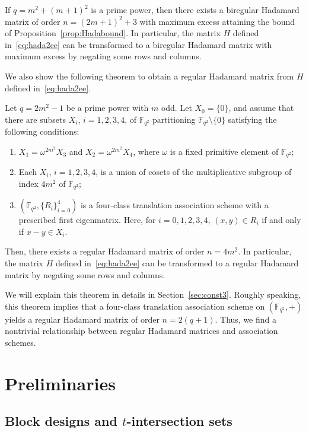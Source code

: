 \documentclass[ALCO,ThmDefs,Unicode]{cedram}
\newcommand*\F{{\mathbb F}}
\begin{document}
\begin{theo}\label{thm:main2}
If $q=m^2+(m+1)^2$ is a prime power, then there exists a biregular Hadamard matrix of order $n=(2m+1)^2+3$ with maximum excess attaining the bound of Proposition~\ref{prop:Hadabound}. In particular, the matrix $H$ defined in~\eqref{eq:hada2ee} can be transformed to a biregular Hadamard matrix with maximum excess by negating some rows and columns.
\end{theo}

We also show the following theorem to obtain a regular Hadamard matrix from $H $ defined in~\eqref{eq:hada2ee}.

\begin{theo}\label{thm:main3tr}
Let $q=2m^2-1$ be a prime power with $m$ odd. Let $X_0=\{0\}$, and assume that there are subsets $X_i$, $i=1,2,3,4$, of $\F_{q^2}$ partitioning $\F_{q^2}\setminus \{0\}$ satisfying the following conditions:
\begin{enumerate}
\item $X_1=\omega^{2m^2}X_3$ and $X_2=\omega^{2m^2}X_4$, where $\omega$ is a fixed primitive element of $\F_{q^2}$;
\item Each $X_i$, $i=1,2,3,4$, is a union of cosets of the multiplicative subgroup of index $4m^2$ of $\F_{q^2}$;
\item $(\F_{q^2},\{R_i\}_{i=0}^4)$ is a four-class translation association scheme with a prescribed first eigenmatrix. Here, for $i=0,1,2,3,4$, $(x,y)\in R_i$ if and only if $x-y \in X_i$.
\end{enumerate}
Then, there exists a regular Hadamard matrix of order $n=4m^2$. In particular, the matrix $H$ defined in~\eqref{eq:hada2ee} can be transformed to a regular Hadamard matrix by negating some rows and columns.
\end{theo}

We will explain this theorem in details in Section~\ref{sec:const3}. Roughly speaking, this theorem implies that a four-class translation association scheme on $(\F_{q^2},+)$ yields a regular Hadamard matrix of order $n=2(q+1)$. Thus, we find a nontrivial relationship between regular Hadamard matrices and association schemes.


\section{Preliminaries}

\subsection{Block designs and \texorpdfstring{$t$}{t}-intersection sets}
\end{document}
